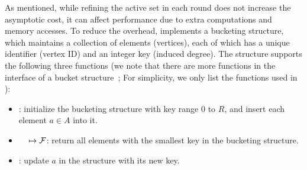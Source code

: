 
As mentioned, while refining the active set in each round does not increase the asymptotic cost, it can affect performance due to extra computations and memory accesses. 
To reduce the overhead, \Julienne{} implements a bucketing structure, 
which maintains a collection of elements (vertices), each of which has a unique identifier (vertex ID) and an integer key (induced degree). 
The structure supports the following three functions (we note that there are more functions in the interface of a bucket structure~\cite{dhulipala2017}; For simplicity, we only list the functions used in \kcore):

\begin{itemize}
    \item \textbf{}: initialize the bucketing structure with key range 0 to $R$, and insert each element $a\in A$ into it.
    \item \textbf{\FGetNextBucket~~$\mapsto {\mathcal{F}}$}: return all elements with the smallest key in the bucketing structure.
    \item \textbf{}: update $a$ in the structure with its new key.
\end{itemize}

